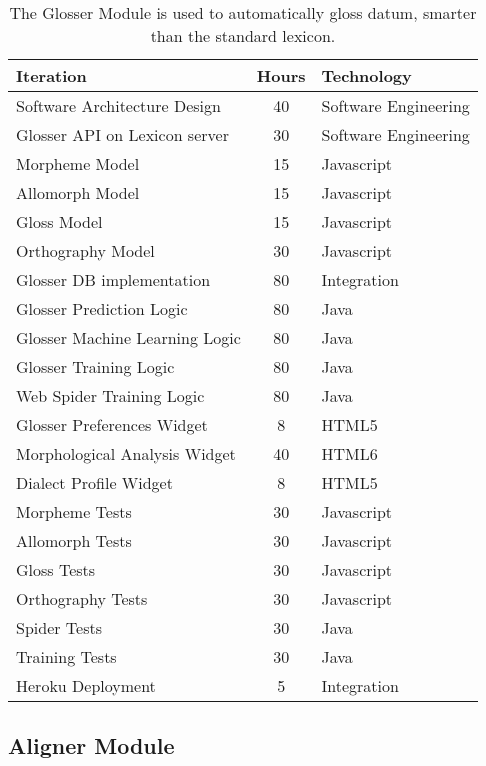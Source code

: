 \documentclass[12 pt]{article}
\begin{document}
\footnotesize
\begin{table}[htbp]
\begin{center}
  \begin{tabular}{ | lcl | }
\hline

Iteration&	Hours&	Technology	\\
\hline
Software Architecture Design&	40&	Software Engineering	\\ 
Glosser API on Lexicon server&	30&	Software Engineering\\ 
Morpheme Model&	15&	Javascript	\\ 
Allomorph Model&	15&	Javascript	\\ 
Gloss Model&	15&	Javascript	\\ 
Orthography Model&	30&	Javascript	\\ 
Glosser DB implementation&	80&	Integration	\\ 
Glosser Prediction Logic&	80&	Java	\\ 
Glosser Machine Learning Logic&	80&	Java	\\ 
Glosser Training Logic&	80&	Java	\\ 
Web Spider Training Logic&	80&	Java	\\ 
Glosser Preferences Widget&	8&	HTML5	\\ 
Morphological Analysis Widget&	40&	HTML6	\\ 
Dialect Profile Widget&	8&	HTML5 \\ 
Morpheme Tests&	30&	Javascript	\\ 
Allomorph Tests&	30&  Javascript \\ 
Gloss Tests&	         30&  Javascript \\ 
Orthography Tests&	30&  Javascript \\ 
Spider Tests&	30&	Java \\ 
Training Tests&	30&	Java	\\ 
Heroku Deployment&	5&  Integration \\ 
\hline
  \end{tabular}
   \caption{The Glosser Module is used to automatically gloss datum, smarter than the standard lexicon.}
  \label{tab:label}
  \end{center}
\end{table}


\newpage
\subsection{Aligner Module}
\end{document}
